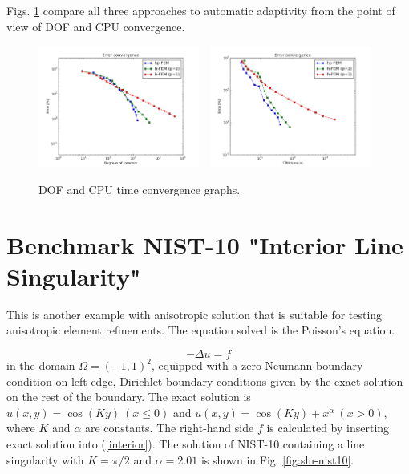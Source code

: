 \documentclass[12pt]{elsarticle}
\begin{document}

Figs. \ref{fig:nist-9-conv} compare all
three approaches to automatic adaptivity from the point
of view of DOF and CPU convergence.

\begin{figure}[!ht]
\centering
\includegraphics[height=4cm]{nist/nist-9/conv_dof_aniso.png}\ \
\includegraphics[height=4cm]{nist/nist-9/conv_cpu_aniso.png}
\caption{DOF and CPU time convergence graphs.}
\label{fig:nist-9-conv}
\end{figure}



\section{Benchmark NIST-10 "Interior Line Singularity"}
\label{sec:bench-10}

This is another example with anisotropic solution that is suitable for testing
anisotropic element refinements. The equation solved is the Poisson's equation.

\begin{equation} \label{interior}
-\Delta u = f
\end{equation}
in the domain $\Omega = (-1, 1)^2$, equipped with a zero
Neumann boundary condition on left edge, Dirichlet boundary
conditions given by the exact solution on the rest of the boundary.
The exact solution is
$u(x,y) = \cos(Ky)\ (x \le 0)$ and $u(x,y) = \cos(Ky) + x^{\alpha}\ (x > 0)$,
where $K$ and $\alpha$ are constants.
The right-hand side $f$ is calculated by inserting exact solution into (\ref{interior}).
The solution of NIST-10 containing a line singularity with $K = \pi/2$ and
$\alpha = 2.01$ is shown in Fig. \ref{fig:sln-nist10}.
\end{document}
